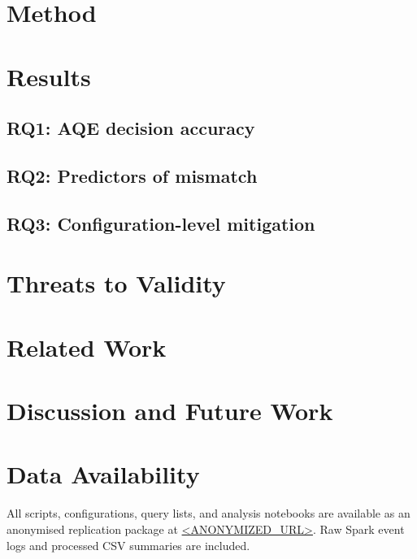 \documentclass[a4paper,UKenglish,cleveref,autoref,thm-restate]{lipics-v2021}
\begin{document}
\section{Method}
\label{sec:method}

\section{Results}
\subsection{RQ1: AQE decision accuracy}
\subsection{RQ2: Predictors of mismatch}
\subsection{RQ3: Configuration-level mitigation}

\section{Threats to Validity}

\section{Related Work}

\section{Discussion and Future Work}

\section*{Data Availability}
All scripts, configurations, query lists, and analysis notebooks are available
as an anonymised replication package at \url{<ANONYMIZED_URL>}. Raw Spark
event logs and processed CSV summaries are included.


\end{document}
